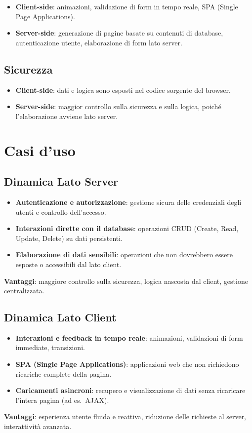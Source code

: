 \begin{itemize}
    \item \textbf{Client-side}: animazioni, validazione di form in tempo reale, SPA (Single Page Applications).
    \item \textbf{Server-side}: generazione di pagine basate su contenuti di database, autenticazione utente, elaborazione di form lato server.
\end{itemize}

\subsection{Sicurezza}

\begin{itemize}
    \item \textbf{Client-side}: dati e logica sono esposti nel codice sorgente del browser.
    \item \textbf{Server-side}: maggior controllo sulla sicurezza e sulla logica, poiché l'elaborazione avviene lato server.
\end{itemize}

\section{Casi d'uso}

\subsection{Dinamica Lato Server}

\begin{itemize}
    \item \textbf{Autenticazione e autorizzazione}: gestione sicura delle credenziali degli utenti e controllo dell'accesso.
    \item \textbf{Interazioni dirette con il database}: operazioni CRUD (Create, Read, Update, Delete) su dati persistenti.
    \item \textbf{Elaborazione di dati sensibili}: operazioni che non dovrebbero essere esposte o accessibili dal lato client.
\end{itemize}

\textbf{Vantaggi}: maggiore controllo sulla sicurezza, logica nascosta dal client, gestione centralizzata.

\subsection{Dinamica Lato Client}

\begin{itemize}
    \item \textbf{Interazioni e feedback in tempo reale}: animazioni, validazioni di form immediate, transizioni.
    \item \textbf{SPA (Single Page Applications)}: applicazioni web che non richiedono ricariche complete della pagina.
    \item \textbf{Caricamenti asincroni}: recupero e visualizzazione di dati senza ricaricare l'intera pagina (ad es.\ AJAX).
\end{itemize}

\textbf{Vantaggi}: esperienza utente fluida e reattiva, riduzione delle richieste al server, interattività avanzata.
